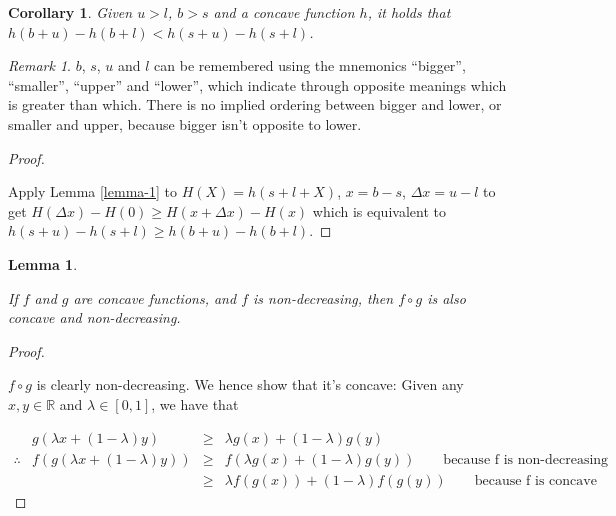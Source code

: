 \documentclass[
]{article}
\theoremstyle{theorem}
\theoremstyle{lemma}
\newtheorem{lemma}{Lemma}
\theoremstyle{corollary}
\newtheorem{corollary}{Corollary}[lemma]
\theoremstyle{remark}
\newtheorem*{remark}{Remark}
\theoremstyle{definition}
\begin{document}
\begin{corollary}
\label{corollary-1.1}
Given \(u > l\), \(b > s\) and a concave function \(h\), it holds that \(h(b + u) - h(b + l) < h(s + u) - h(s + l)\).
\end{corollary}
\begin{remark}
\(b\), \(s\), \(u\) and \(l\) can be remembered using the mnemonics ``bigger'', ``smaller'', ``upper'' and ``lower'', which indicate through opposite meanings which is greater than which. There is no implied ordering between bigger and lower, or smaller and upper, because bigger isn't opposite to lower.
\end{remark}
\begin{proof}
\hypertarget{proof-1}{%
\label{proof-1}}
Apply Lemma \ref{lemma-1} to \(H(X) = h(s + l + X)\), \(x = b - s\), \(\Delta x = u - l\) to get \(H(\Delta x) - H(0) \geq H(x + \Delta x) - H(x)\) which is equivalent to \(h(s + u) - h(s + l) \geq h(b + u) - h(b + l)\).

\end{proof}
\begin{lemma}
\hypertarget{lemma-2}{%
\label{lemma-2}}


If \(f\) and \(g\) are concave functions, and \(f\) is non-decreasing, then \(f \circ g\) is also concave and non-decreasing.
\end{lemma}

\begin{proof}

\hypertarget{proof-2}{%
\label{proof-2}}
\(f \circ g\) is clearly non-decreasing. We hence show that it's concave: Given any \(x, y \in \mathbb R\) and \(\lambda\in[0,1]\), we have that

\[\begin{aligned}
& g(\lambda x + (1 - \lambda)y) &\geq& \lambda g(x) + (1-\lambda) g(y)\\
\therefore& f(g(\lambda x + (1 - \lambda)y)) &\geq& f(\lambda g(x) + (1-\lambda) g(y)) \qquad{\text{because f is non-decreasing}}\\
&&\geq& \lambda f(g(x)) + (1-\lambda) f(g(y)) \qquad{\text{because f is concave}}
\end{aligned}\]

\end{proof}
\end{document}
